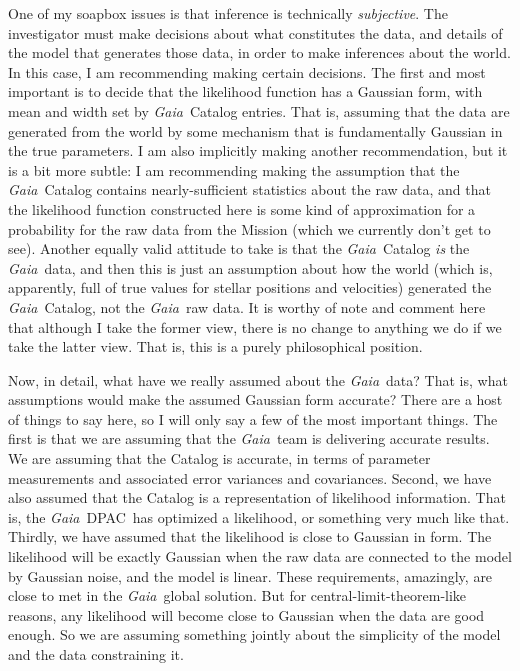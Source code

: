 \documentclass[12pt, modern]{aastex62h}
\newcommand{\acronym}[1]{{\small{#1}}}
\newcommand{\Gaia}{\textsl{Gaia}}
\newcommand{\DPAC}{{\acronym{DPAC}}}
\begin{document}
One of my soapbox issues is that inference is technically \emph{subjective}.
The investigator must make decisions about what constitutes the data,
and details of the model that generates those data, in order to make
inferences about the world.
In this case, I am recommending making certain decisions.
The first and most important is to decide that the likelihood function
has a Gaussian form, with mean and width set by \Gaia\ Catalog entries.
That is, assuming that the data are generated from the world by some mechanism
that is fundamentally Gaussian in the true parameters.
I am also implicitly making another recommendation, but it is a bit more
subtle:
I am recommending making the assumption that the \Gaia\ Catalog contains
nearly-sufficient statistics about the raw data, and that the likelihood function
constructed here is some kind of approximation for a probability for the raw data
from the Mission (which we currently don't get to see).
Another equally valid attitude to take is that the \Gaia\ Catalog
\emph{is}
the \Gaia\ data, and then this is just an assumption about how the world
(which is, apparently, full of true values for stellar positions and velocities)
generated the \Gaia\ Catalog, not the \Gaia\ raw data.
It is worthy of note and comment here that although I take the former view,
there is no change to anything we do if we take the latter view.
That is, this is a purely philosophical position.

Now, in detail, what have we really assumed about the \Gaia\ data?
That is, what assumptions would make the assumed Gaussian form accurate?
There are a host of things to say here, so I will only say a few of the
most important things.
The first is that we are assuming that the \Gaia\ team is delivering
accurate results.
We are assuming that the Catalog is accurate, in terms of parameter
measurements and associated error variances and covariances.
Second, we have also assumed that the Catalog is a representation of likelihood
information.
That is, the \Gaia\ \DPAC\ has optimized a likelihood, or something very much
like that.
Thirdly, we have assumed that the likelihood is close to Gaussian in form.
The likelihood will be exactly Gaussian when the raw data are connected
to the model by Gaussian noise, and the model is linear.
These requirements, amazingly, are close to met in the \Gaia\ global solution.
But for central-limit-theorem-like reasons, any likelihood will become close
to Gaussian when the data are good enough.
So we are assuming something jointly about the simplicity of the model and
the data constraining it.
\end{document}
